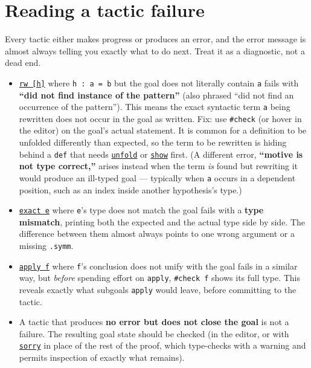 \section{Reading a tactic failure}\label{sec:04-tactics:03-reading-failures:1}

Every tactic either makes progress or produces an error, and the error message is almost always telling you exactly what to do next. Treat it as a diagnostic, not a dead end.

\begin{itemize}
\tightlist
\item
  \href{https://lean-lang.org/doc/reference/latest/Tactic-Proofs/Tactic-Reference/}{\texttt{rw [h]}} where \texttt{h : a = b} but the goal does not literally contain \texttt{a} fails with \textbf{``did not find instance of the pattern''} (also phrased ``did not find an occurrence of the pattern''). This means the exact syntactic term \texttt{a} being rewritten does not occur in the goal as written. Fix: use \texttt{\#check} (or hover in the editor) on the goal's actual statement. It is common for a definition to be unfolded differently than expected, so the term to be rewritten is hiding behind a \texttt{def} that needs \href{https://lean-lang.org/doc/reference/latest/Tactic-Proofs/Tactic-Reference/}{\texttt{unfold}} or \href{https://lean-lang.org/doc/reference/latest/Tactic-Proofs/Tactic-Reference/}{\texttt{show}} first. (A different error, \textbf{``motive is not type correct,''} arises instead when the term \emph{is} found but rewriting it would produce an ill-typed goal --- typically when \texttt{a} occurs in a dependent position, such as an index inside another hypothesis's type.)
\item
  \href{https://lean-lang.org/doc/reference/latest/Tactic-Proofs/Tactic-Reference/}{\texttt{exact e}} where \texttt{e}'s type does not match the goal fails with a \textbf{type mismatch}, printing both the expected and the actual type side by side. The difference between them almost always points to one wrong argument or a missing \texttt{.symm}.
\item
  \href{https://lean-lang.org/doc/reference/latest/Tactic-Proofs/Tactic-Reference/}{\texttt{apply f}} where \texttt{f}'s conclusion does not unify with the goal fails in a similar way, but \emph{before} spending effort on \texttt{apply}, \texttt{\#check f} shows its full type. This reveals exactly what subgoals \texttt{apply} would leave, before committing to the tactic.
\item
  A tactic that produces \textbf{no error but does not close the goal} is not a failure. The resulting goal state should be checked (in the editor, or with \href{https://lean-lang.org/doc/reference/latest/Tactic-Proofs/Tactic-Reference/}{\texttt{sorry}} in place of the rest of the proof, which type-checks with a warning and permits inspection of exactly what remains).
\end{itemize}

